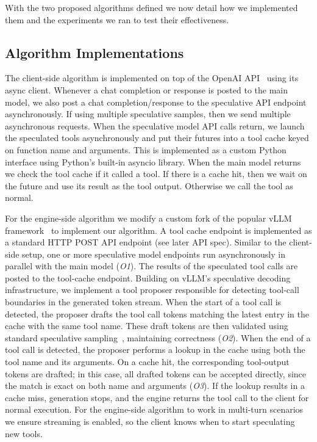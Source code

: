 With the two proposed algorithms defined we now detail how we implemented them and the experiments we ran to test their effectiveness.


\subsection{Algorithm Implementations}\label{sec:impl}

The client-side algorithm is implemented on top of the OpenAI API~\cite{noauthor_openaiopenai-python_2025} using its async client.
Whenever a chat completion or response is posted to the main model, we also post a chat completion/response to the speculative API endpoint asynchronously.
If using multiple speculative samples, then we send multiple asynchronous requests.
When the speculative model API calls return, we launch the speculated tools asynchronously and put their futures into a tool cache keyed on function name and arguments.
This is implemented as a custom Python interface using Python's built-in asyncio library.
When the main model returns we check the tool cache if it called a tool.
If there is a cache hit, then we wait on the future and use its result as the tool output.
Otherwise we call the tool as normal.

For the engine-side algorithm we modify a custom fork of the popular vLLM framework~\cite{kwon2023efficient} to implement our algorithm.
A tool cache endpoint is implemented as a standard HTTP POST API endpoint (see later API spec). Similar to the client-side setup, one or more speculative model endpoints run asynchronously in parallel with the main model (\emph{O1}). The results of the speculated tool calls are posted to the tool-cache endpoint. 
Building on vLLM’s speculative decoding infrastructure, we implement a tool proposer responsible for detecting tool-call boundaries in the generated token stream. When the start of a tool call is detected, the proposer drafts the tool call tokens matching the latest entry in the cache with the same tool name. These draft tokens are then validated using standard speculative sampling~\cite{leviathan_fast_2023}, maintaining correctness (\emph{O2}). When the end of a tool call is detected, the proposer performs a lookup in the cache using both the tool name and its arguments. On a cache hit, the corresponding tool-output tokens are drafted; in this case, all drafted tokens can be accepted directly, since the match is exact on both name and arguments (\emph{O3}). If the lookup results in a cache miss, generation stops, and the engine returns the tool call to the client for normal execution.
For the engine-side algorithm to work in multi-turn scenarios we ensure streaming is enabled, so the client knows when to start speculating new tools.

